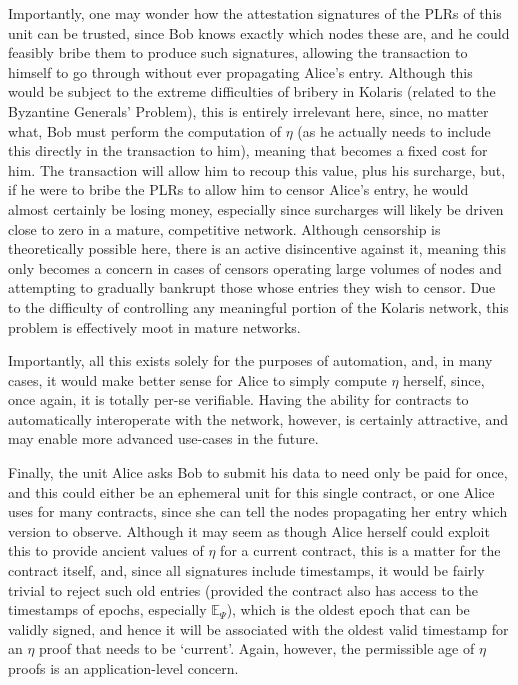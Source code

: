 \documentclass{extreport}
\begin{document}
Importantly, one may wonder how the attestation signatures of the PLRs of this unit can be trusted, since Bob knows exactly which nodes these are, and he could feasibly bribe them to produce such signatures, allowing the transaction to himself to go through without ever propagating Alice's entry. Although this would be subject to the extreme difficulties of bribery in Kolaris (related to the Byzantine Generals' Problem), this is entirely irrelevant here, since, no matter what, Bob must perform the computation of \(\eta\) (as he actually needs to include this directly in the transaction to him), meaning that becomes a fixed cost for him. The transaction will allow him to recoup this value, plus his surcharge, but, if he were to bribe the PLRs to allow him to censor Alice's entry, he would almost certainly be losing money, especially since surcharges will likely be driven close to zero in a mature, competitive network. Although censorship is theoretically possible here, there is an active disincentive against it, meaning this only becomes a concern in cases of censors operating large volumes of nodes and attempting to gradually bankrupt those whose entries they wish to censor. Due to the difficulty of controlling any meaningful portion of the Kolaris network, this problem is effectively moot in mature networks.

Importantly, all this exists solely for the purposes of automation, and, in many cases, it would make better sense for Alice to simply compute \(\eta\) herself, since, once again, it is totally per-se verifiable. Having the ability for contracts to automatically interoperate with the network, however, is certainly attractive, and may enable more advanced use-cases in the future.

Finally, the unit Alice asks Bob to submit his data to need only be paid for once, and this could either be an ephemeral unit for this single contract, or one Alice uses for many contracts, since she can tell the nodes propagating her entry which version to observe. Although it may seem as though Alice herself could exploit this to provide ancient values of \(\eta\) for a current contract, this is a matter for the contract itself, and, since all signatures include timestamps, it would be fairly trivial to reject such old entries (provided the contract also has access to the timestamps of epochs, especially \(\mathbb{E}_\Psi\)), which is the oldest epoch that can be validly signed, and hence it will be associated with the oldest valid timestamp for an \(\eta\) proof that needs to be `current'. Again, however, the permissible age of \(\eta\) proofs is an application-level concern.
\end{document}
